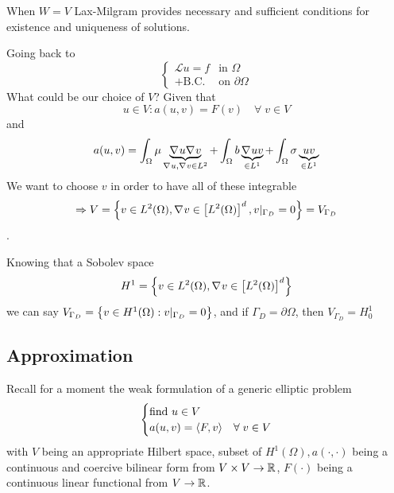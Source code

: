 When \(W=V\) Lax-Milgram provides necessary and sufficient conditions for existence and uniqueness of solutions.

Going back to 
\begin{equation*}
    \begin{cases}
        \mathcal{L}u = f & \text{in }\Omega \\
        + \text{B.C.} & \text{on }\partial\Omega
    \end{cases}
\end{equation*}
What could be our choice of \(V\)? Given that
\[
    u\in V : a(u,v) = F(v) \quad \forall \; v \in V
\]
and 
\[
    a(u,v) = \int_\Omega \mu \underbrace{\nabla\mspace{1mu} u \nabla\mspace{1mu} v}_{\nabla\mspace{1mu} u, \nabla\mspace{1mu} v \in L^2} + \int_\Omega b \underbrace{\nabla\mspace{1mu} u v}_{\in L^1} + \int_\Omega \sigma \underbrace{u v}_{\in L^1}
\]
We want to choose \(v\) in order to have all of these integrable \[\Rightarrow V = \left\{v \in L^2(\Omega), \nabla\mspace{1mu} v \in \left[L^2(\Omega)\right]^d, v\vert_{\Gamma_D} = 0\right\} = V_{\Gamma_D}\].

Knowing that a Sobolev space 
\[
    H^1 = \left\{v \in L^2(\Omega), \nabla\mspace{1mu} v \in \left[L^2(\Omega)\right]^d\right\}
\]
we can say \(V_{\Gamma_D} = \left\{v \in H^1(\Omega): v\vert_{\Gamma_D}= 0\right\}\), and if \(\Gamma_D = \partial\Omega\), then \(V_{\Gamma_D} = H^1_0\)
\subsection{Approximation}
Recall for a moment the weak formulation of a generic elliptic problem 
\begin{equation}
    \begin{cases}
        \text{find } u \in V \\
        a(u,v) = \langle F,v \rangle & \forall \; v \in V \label{Weak Formulation of Boundary Value Problems - 2}
    \end{cases}
\end{equation}
with \(V\) being an appropriate Hilbert space, subset of \(H^1(\Omega), a(\cdot,\cdot)\) being a continuous and coercive bilinear form from \(V \times V \to \mathbb{R}\), \(F(\cdot)\) being a continuous linear functional from \(V \to \mathbb{R}\).

